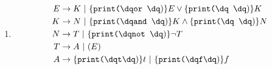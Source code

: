 \documentclass[a4paper,10pt]{scrartcl}
\begin{document}
\begin{enumerate}
\begin{center}
{{{{{                                
                            }
                        }
                    }
                    \TR*{$\land$}
                }
            }
        \end{center}
 \item  \begin{align*}
            E &\to K\ |\ \print{or } E \lor\print{ } K \\
            K &\to N\ |\ \print{and } K \land\print{ } N \\
            N &\to T\ |\ \print{not } \neg T\\
            T &\to A\ |\ (E)\\
            A &\to \print{t} t\ |\ \print{f} f
        \end{align*}
\end{enumerate}
\end{document}
